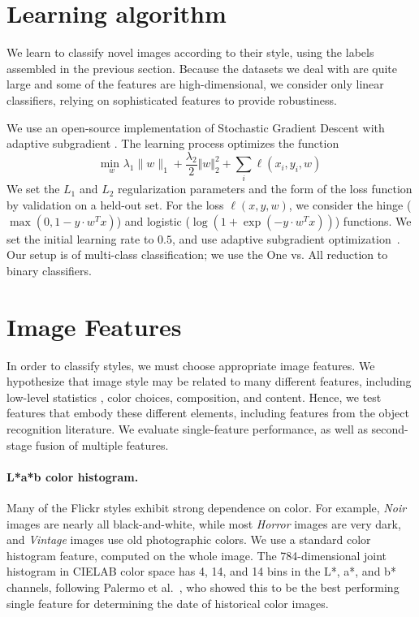 \section{Learning algorithm}

We learn to classify novel images according to their style, using the labels assembled in the previous section.
Because the datasets we deal with are quite large and some of the features are high-dimensional, we consider only linear classifiers, relying on sophisticated features to provide robustiness.

We use an open-source implementation of Stochastic Gradient Descent with adaptive subgradient \parencite{Agarwal-JMLR-2012}.
The learning process optimizes the function \[
\underset{w}{\text{min }} \lambda_1 \|w\|_1 + \frac{\lambda_2}{2} \Vert w \Vert_2^2 + \sum_i \ell(x_i, y_i, w)
\]
We set the $L_1$ and $L_2$ regularization parameters and the form of the loss function by validation on a held-out set.
For the loss $\ell(x, y, w)$, we consider the hinge ($\max(0, 1 - y \cdot w^T x)$) and logistic ($\log(1 + \exp(-y \cdot w^T x))$) functions.
We set the initial learning rate to $0.5$, and use adaptive subgradient optimization~\parencite{duchi2011adaptive}.
Our setup is of multi-class classification; we use the One vs. All reduction to binary classifiers.

\section{Image Features}

In order to classify styles, we must choose appropriate image features.  We hypothesize that image style may be related to many different features, including low-level statistics \parencite{Lyu-PNAS-2004}, color choices, composition, and content.  Hence, we test features that embody these different elements, including features from the object recognition literature.
We evaluate single-feature performance, as well as second-stage fusion of multiple features.

\paragraph{L*a*b color histogram.}
Many of the Flickr styles exhibit strong dependence on color. For example, \emph{Noir} images are nearly all black-and-white, while most \emph{Horror} images are very dark, and \emph{Vintage} images use old photographic colors. We use a standard color histogram feature, computed on the whole image.
The 784-dimensional joint histogram in CIELAB color space has 4, 14, and 14 bins in the L*, a*, and b* channels, following Palermo et al.~\parencite{Palermo-ECCV-2012}, who showed this to be the best performing single feature for determining the date of historical color images.

